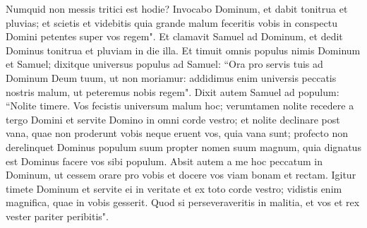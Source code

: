 \begin{biblechapter}
\verse Numquid non messis tritici est hodie? Invocabo Dominum, et dabit tonitrua et pluvias; et scietis et videbitis quia grande malum feceritis vobis in conspectu Domini petentes super vos regem". 
\verse Et clamavit Samuel ad Dominum, et dedit Dominus tonitrua et pluviam in die illa. 
\verse Et timuit omnis populus nimis Dominum et Samuel; dixitque universus populus ad Samuel: “Ora pro servis tuis ad Dominum Deum tuum, ut non moriamur: addidimus enim universis peccatis nostris malum, ut peteremus nobis regem". 
\verse Dixit autem Samuel ad populum: “Nolite timere. Vos fecistis universum malum hoc; verumtamen nolite recedere a tergo Domini et servite Domino in omni corde vestro; 
\verse et nolite declinare post vana, quae non proderunt vobis neque eruent vos, quia vana sunt; 
\verse profecto non derelinquet Dominus populum suum propter nomen suum magnum, quia dignatus est Dominus facere vos sibi populum.  
\verse Absit autem a me hoc peccatum in Dominum, ut cessem orare pro vobis et docere vos viam bonam et rectam. 
\verse Igitur timete Dominum et servite ei in veritate et ex toto corde vestro; vidistis enim magnifica, quae in vobis gesserit. 
\verse Quod si perseveraveritis in malitia, et vos et rex vester pariter peribitis". 
\end{biblechapter}


